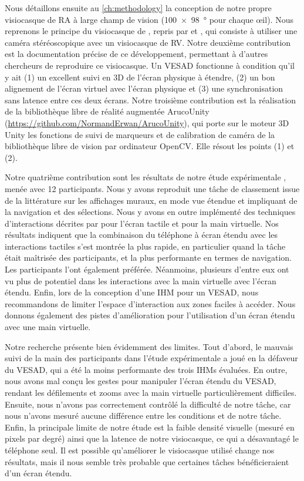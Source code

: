 Nous détaillons ensuite au \autoref{ch:methodology} la conception de notre propre visiocasque de RA à large champ de vision (\SI{100x98}{\degree} pour chaque \oe il). Nous reprenons le principe du visiocasque de \cite{Steptoe2013}, repris par \cite{Steptoe2014} et \cite{Piumsomboon2014}, qui consiste à utiliser une caméra stéréoscopique  avec un visiocasque de RV. Notre deuxième contribution est la documentation précise de ce développement, permettant à d'autres chercheurs de reproduire ce visiocasque. Un VESAD fonctionne à condition qu'il y ait (1) un excellent suivi en 3D de l'écran physique à étendre, (2) un bon alignement de l'écran virtuel avec l'écran physique et (3) une synchronisation sans latence entre ces deux écrans. Notre troisième contribution est la réalisation de la bibliothèque libre de réalité augmentée ArucoUnity (\url{https://github.com/NormandErwan/ArucoUnity}), qui porte sur le moteur 3D Unity les fonctions de suivi de marqueurs et de calibration de caméra de la bibliothèque libre de vision par ordinateur OpenCV. Elle résout les points (1) et (2).

Notre quatrième contribution sont les résultats de notre étude expérimentale , menée avec 12 participants. Nous y avons reproduit une tâche de classement issue de la littérature sur les affichages muraux, en mode vue étendue et impliquant de la navigation et des sélections. Nous y avons en outre implémenté des techniques d'interactions décrites par \cite{Wobbrock2009} pour l'écran tactile et \cite{Piumsomboon2013} pour la main virtuelle. Nos résultats indiquent que la combinaison du téléphone à écran étendu avec les interactions tactiles s'est montrée la plus rapide, en particulier quand la tâche était maîtrisée des participants, et la plus performante en termes de navigation. Les participants l'ont également préférée. Néanmoins, plusieurs d'entre eux ont vu plus de potentiel dans les interactions avec la main virtuelle avec l'écran étendu. Enfin, lors de la conception d'une IHM pour un VESAD, nous recommandons de limiter l'espace d'interaction aux zones faciles à accéder. Nous donnons également des pistes d'amélioration pour l'utilisation d'un écran étendu avec une main virtuelle.

Notre recherche présente bien évidemment des limites. Tout d'abord, le mauvais suivi de la main des participants dans l'étude expérimentale a joué en la défaveur du VESAD, qui a été la moins performante des trois IHMs évaluées. En outre, nous avons mal conçu les gestes pour manipuler l'écran étendu du VESAD, rendant les défilements et zooms avec la main virtuelle particulièrement difficiles. Ensuite, nous n'avons pas correctement contrôlé la difficulté de notre tâche, car nous n'avons mesuré aucune différence entre les conditions  et  de notre tâche. Enfin, la principale limite de notre étude est la faible densité visuelle (mesuré en pixels par degré) ainsi que la latence de notre visiocasque, ce qui a désavantagé le téléphone seul. Il est possible qu'améliorer le visiocasque utilisé change nos résultats, mais il nous semble très probable que certaines tâches bénéficieraient d'un écran étendu.

